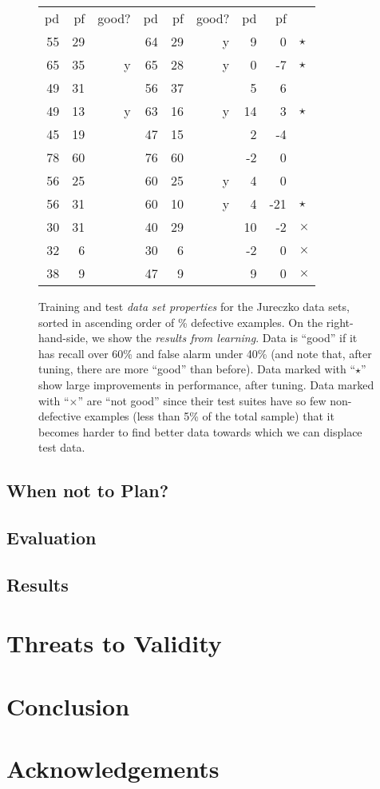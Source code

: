 \documentclass{sig-alternate}
\begin{document}
\begin{figure*}[!t]
\begin{center}
\begin{minipage}{.4\linewidth}
\begin{tabular}{|rrr|rrr|rr|l}
  pd & pf & good? & pd & pf & good? & pd & pf\\\cline{1-8}
  55 & 29 &   & 64 & 29 & y & 9 & 0&$\star$\\
  65 & 35 & y & 65 & 28 & y & 0 & -7&$\star$\\
  49 & 31 &   & 56 & 37 &   & 5 & 6\\
  49 & 13 & y & 63 & 16 & y & 14 & 3&$\star$\\
  45 & 19 &   & 47 & 15 &   & 2 & -4\\
  78 & 60 &   & 76 & 60 &   & -2 & 0\\
  56 & 25 &   & 60 & 25 & y & 4 & 0\\
  56 & 31 &   & 60 & 10 & y & 4 & -21&$\star$\\
 30 & 31 &   & 40 & 29 &   & 10 & -2&$\times$\\
  32 & 6 &   & 30 & 6 &   & -2 & 0&$\times$\\
  38 & 9 &   & 47 & 9 &   & 9 & 0&$\times$\\
\hline 
\end{tabular}

\end{minipage}
\end{center}    
  
    \caption{Training and test {\em data set properties} for the Jureczko data sets,
    sorted in ascending order of \% defective examples.
    On the right-hand-side, we show the {\em results from learning}.
    Data is ``good'' if it has recall over 60\% and false alarm under 40\%
(and note that, after tuning, there are more ``good'' than before).
Data   marked with ``$\star$'' show large improvements in performance, after tuning.
Data   marked with ``$\times$'' are ``not good'' since their test suites  have so few non-defective examples (less than 5\% of the total sample) that it becomes harder to find better data towards which we can displace test data.
}\label{fig:j}
\end{figure*}
\subsection{When not to Plan?}
\subsection{Evaluation}
\subsection{Results}
\section{Threats to Validity}
\section{Conclusion}
\section*{Acknowledgements}



\end{document}
